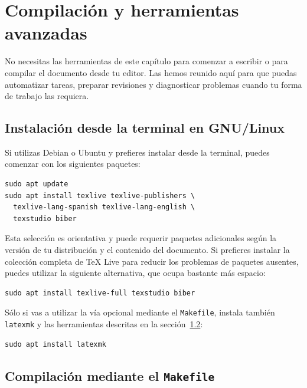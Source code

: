 %

\chapter{Compilación y herramientas avanzadas}
\label{cha:compilacion-avanzada}

No necesitas las herramientas de este capítulo para comenzar a escribir o para compilar el documento desde tu editor. Las hemos reunido aquí para que puedas automatizar tareas, preparar revisiones y diagnosticar problemas cuando tu forma de trabajo las requiera.

\section{Instalación desde la terminal en GNU/Linux}
\label{sec:instalacion-gnu-linux}

Si utilizas Debian o Ubuntu y prefieres instalar desde la terminal, puedes comenzar con los siguientes paquetes:

\begin{verbatim}
sudo apt update
sudo apt install texlive texlive-publishers \
  texlive-lang-spanish texlive-lang-english \
  texstudio biber
\end{verbatim}

Esta selección es orientativa y puede requerir paquetes adicionales según la versión de tu distribución y el contenido del documento. Si prefieres instalar la colección completa de TeX Live para reducir los problemas de paquetes ausentes, puedes utilizar la siguiente alternativa, que ocupa bastante más espacio:

\begin{verbatim}
sudo apt install texlive-full texstudio biber
\end{verbatim}

Sólo si vas a utilizar la vía opcional mediante el \texttt{Makefile}, instala también \texttt{latexmk} y las herramientas descritas en la sección~\ref{sec:compilacion-makefile}:

\begin{verbatim}
sudo apt install latexmk
\end{verbatim}

\section{Compilación mediante el \texttt{Makefile}}
\label{sec:compilacion-makefile}

